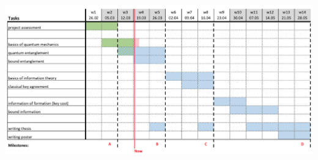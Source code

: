 \documentclass{article}
\begin{document}
\centerline{
	\includegraphics[scale=0.5]{gantt-2.png}
}
%
%	
%	
%	
%	
%	
%	
%	
%
\end{document}
